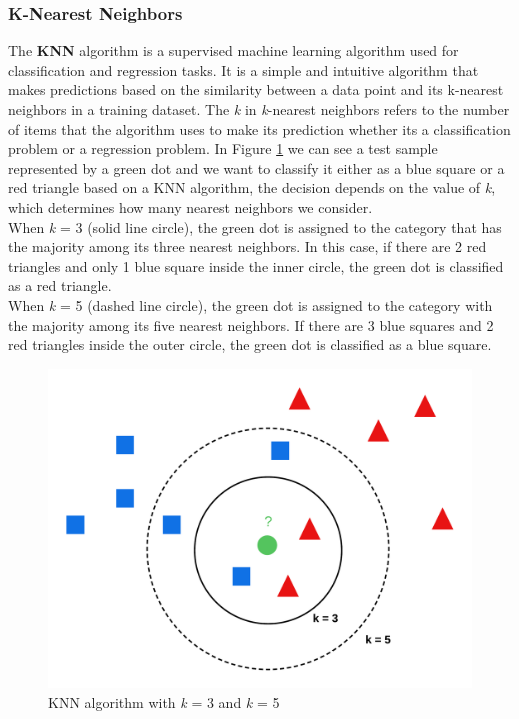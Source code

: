 \subsubsection{K-Nearest Neighbors}
The \textbf{KNN} algorithm is a supervised machine learning algorithm used for classification and regression tasks.
It is a simple and intuitive algorithm that makes predictions based on the similarity between a data point and its k-nearest neighbors in a training dataset.
The \textit{k} in \textit{k}-nearest neighbors refers to the number of items that the algorithm uses to make its prediction whether its a classification problem or a regression problem.
In Figure \ref{fig:knn} we can see a test sample represented by a green dot and we want to classify 
it either as a blue square or a red triangle based on a KNN algorithm, the decision depends on the value of \textit{k}, which determines how many nearest neighbors we consider.\\
When \textit{k} = 3 (solid line circle), the green dot is assigned to the category that has the majority among its three nearest neighbors. 
In this case, if there are 2 red triangles and only 1 blue square inside the inner circle, the green dot is classified as a red triangle. \\
When \textit{k} = 5 (dashed line circle), the green dot is assigned to the category with the majority among its five nearest neighbors. 
If there are 3 blue squares and 2 red triangles inside the outer circle, the green dot is classified as a blue square.
\begin{figure}[H]
    \centering
    \includegraphics[width=0.6\linewidth]{graphics/KNeighbours.png}
    \caption{KNN algorithm with \textit{k} = 3 and \textit{k} = 5}
    \label{fig:knn}
\end{figure}

